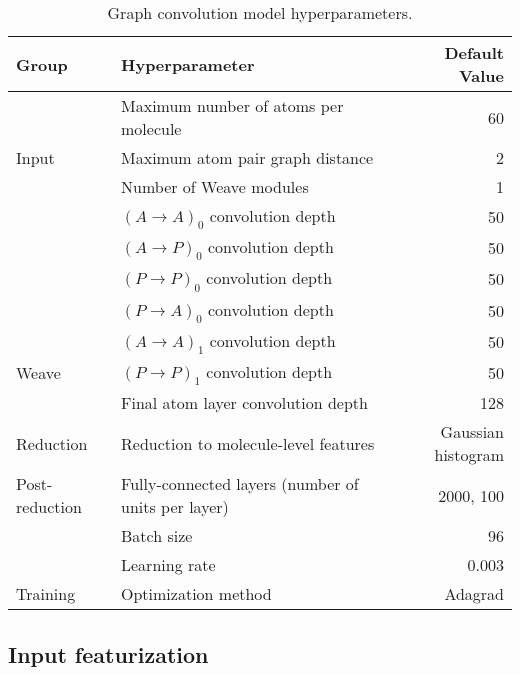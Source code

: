 \begin{table*}[htbp]
  \caption{Graph convolution model hyperparameters.}
  \label{table:hyperparameters}
  \centering
  \begin{tabular}{ l l r }
  \toprule
  Group & Hyperparameter & Default Value \\
  \midrule
  \cellcolor{white} & Maximum number of atoms per molecule & 60 \\
  \multirow{-2}{*}{\cellcolor{white}Input} &
      Maximum atom pair graph distance & 2 \\
  \midrule
  \cellcolor{white} & Number of Weave modules & 1 \\
  \cellcolor{white} & $(A \rightarrow A)_0$ convolution depth & 50 \\
  \cellcolor{white} & $(A \rightarrow P)_0$ convolution depth & 50 \\
  \cellcolor{white} & $(P \rightarrow P)_0$ convolution depth & 50 \\
  \cellcolor{white} & $(P \rightarrow A)_0$ convolution depth & 50 \\
  \cellcolor{white} & $(A \rightarrow A)_1$ convolution depth & 50 \\
  \multirow{-7}{*}{\cellcolor{white}Weave} & $(P \rightarrow P)_1$ convolution depth & 50 \\
  \midrule
  \cellcolor{white} & Final atom layer convolution depth & 128 \\
  \multirow{-2}{*}{\cellcolor{white}Reduction} &
      Reduction to molecule-level features & Gaussian histogram \\
  \midrule
  \cellcolor{white}Post-reduction &
      Fully-connected layers (number of units per layer) & 2000, 100 \\
  \midrule
  \cellcolor{white} & Batch size & 96 \\
  \cellcolor{white} & Learning rate & 0.003 \\
  \multirow{-3}{*}{\cellcolor{white}Training} & Optimization method & Adagrad \\
  \bottomrule
  \end{tabular}
\end{table*}

\subsection{Input featurization}\label{sec:input_features}

